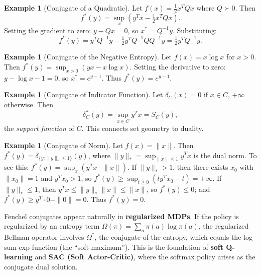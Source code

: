 \documentclass[11pt,a4paper]{article}
\theoremstyle{definition}
\newtheorem{example}[theorem]{Example}
\theoremstyle{remark}
\begin{document}
\begin{example}[Conjugate of a Quadratic]
\label{ex:conjugate-quadratic}
Let $f(x) = \tfrac{1}{2} x^T Q x$ where $Q \succ 0$. Then
\[
  f^*(y) = \sup_x \left( y^T x - \tfrac{1}{2} x^T Q x \right).
\]
Setting the gradient to zero: $y - Qx = 0$, so $x^* = Q^{-1} y$. Substituting:
\[
  f^*(y) = y^T Q^{-1} y - \tfrac{1}{2} y^T Q^{-1} Q Q^{-1} y
  = \tfrac{1}{2} y^T Q^{-1} y.
\]
\end{example}

\begin{example}[Conjugate of the Negative Entropy]
\label{ex:conjugate-entropy}
Let $f(x) = x \log x$ for $x > 0$. Then
$f^*(y) = \sup_{x > 0} (yx - x \log x)$. Setting the derivative to zero: $y - \log x
- 1 = 0$, so $x^* = e^{y-1}$. Thus $f^*(y) = e^{y-1}$.
\end{example}

\begin{example}[Conjugate of Indicator Function]
\label{ex:conjugate-indicator}
Let $\delta_C(x) = 0$ if $x \in C$, $+\infty$ otherwise. Then
\[
  \delta_C^*(y) = \sup_{x \in C} y^T x = S_C(y),
\]
the \emph{support function} of $C$. This connects set geometry to duality.
\end{example}

\begin{example}[Conjugate of Norm]
\label{ex:conjugate-norm}
Let $f(x) = \|x\|$. Then $f^*(y) = \delta_{\{y : \|y\|_* \le 1\}}(y)$, where
$\|y\|_* = \sup_{\|x\| \le 1} y^T x$ is the dual norm. To see this: $f^*(y) =
\sup_x (y^T x - \|x\|)$. If $\|y\|_* > 1$, then there exists $x_0$ with $\|x_0\| = 1$
and $y^T x_0 > 1$, so $f^*(y) \ge \sup_{t \ge 0} (t y^T x_0 - t) = +\infty$. If
$\|y\|_* \le 1$, then $y^T x \le \|y\|_* \|x\| \le \|x\|$, so $f^*(y) \le 0$; and
$f^*(y) \ge y^T \cdot 0 - \|0\| = 0$. Thus $f^*(y) = 0$.
\end{example}

\begin{rlconnection}
Fenchel conjugates appear naturally in \textbf{regularized MDPs}. If the policy is
regularized by an entropy term $\Omega(\pi) = \sum_a \pi(a) \log \pi(a)$, the
regularized Bellman operator involves $\Omega^*$, the conjugate of the entropy, which
equals the log-sum-exp function (the ``soft maximum''). This is the foundation of
\textbf{soft Q-learning} and \textbf{SAC (Soft Actor-Critic)}, where the softmax
policy arises as the conjugate dual solution.
\end{rlconnection}

\end{document}

